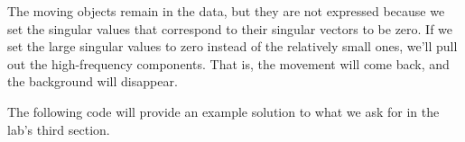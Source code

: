 The moving objects remain in the data, but they are not expressed because we set the singular values that correspond to their singular vectors to be zero. If we set the large singular values to zero instead of the relatively small ones, we'll pull out the high-frequency components. That is, the movement will come back, and the background will disappear.

The following code will provide an example solution to what we ask for in the lab's third section.



